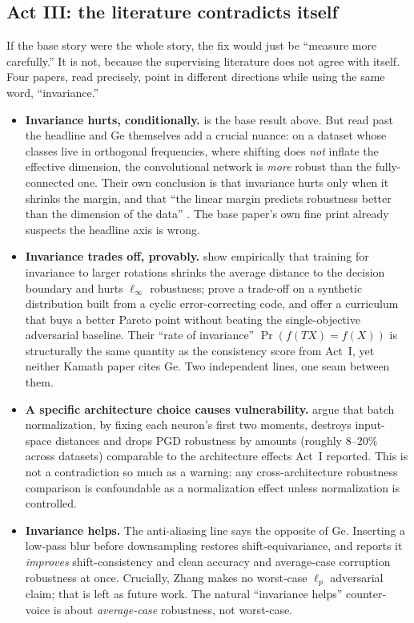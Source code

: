 \subsection{Act III: the literature contradicts itself}
\label{sub:p2-act3}

If the base story were the whole story, the fix would just be ``measure more carefully.'' It is not,
because the supervising literature does not agree with itself. Four papers, read precisely, point in
different directions while using the same word, ``invariance.''

\begin{itemize}[leftmargin=1.4em]
  \item \textbf{Invariance hurts, conditionally.} \citet{ge2021shift} is the base result above.
        But read past the headline and Ge themselves add a crucial nuance: on a dataset whose
        classes live in orthogonal frequencies, where shifting does \emph{not} inflate the effective
        dimension, the convolutional network is \emph{more} robust than the fully-connected one. Their
        own conclusion is that invariance hurts only when it shrinks the margin, and that
        ``the linear margin predicts robustness better than the dimension of the data''
        \citep{ge2021shift}. The base paper's own fine print already suspects the headline axis is
        wrong.
  \item \textbf{Invariance trades off, provably.} \citet{kamath2020} show empirically that training
        for invariance to larger rotations shrinks the average distance to the decision boundary and
        hurts $\ell_\infty$ robustness; \citet{kamath2021} prove a trade-off on a synthetic
        distribution built from a cyclic error-correcting code, and offer a curriculum that buys a
        better Pareto point without beating the single-objective adversarial baseline. Their
        ``rate of invariance'' $\Pr(f(TX)=f(X))$ is structurally the same quantity as the
        consistency score from Act~I, yet neither Kamath paper cites Ge. Two independent lines,
        one seam between them.
  \item \textbf{A specific architecture choice causes vulnerability.} \citet{galloway2019} argue that
        batch normalization, by fixing each neuron's first two moments, destroys input-space
        distances and drops PGD robustness by amounts (roughly $8$--$20\%$ across datasets)
        comparable to the architecture effects Act~I reported. This is not a contradiction so much as
        a warning: any cross-architecture robustness comparison is confoundable as a normalization
        effect unless normalization is controlled.
  \item \textbf{Invariance helps.} The anti-aliasing line says the opposite of Ge. Inserting a
        low-pass blur before downsampling restores shift-equivariance, and \citet{zhang2019blurpool}
        reports it \emph{improves} shift-consistency and clean accuracy and average-case corruption
        robustness at once. Crucially, Zhang makes no worst-case $\ell_p$ adversarial claim; that is
        left as future work. The natural ``invariance helps'' counter-voice is about
        \emph{average-case} robustness, not worst-case.
\end{itemize}

